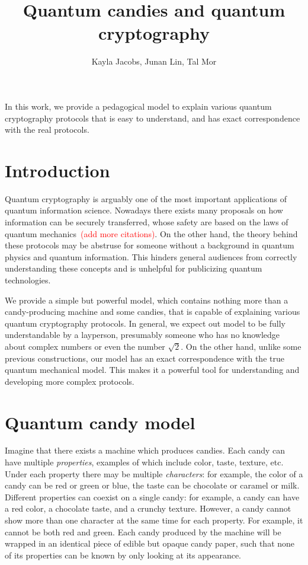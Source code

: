 \documentclass{article}
\def \todo #1{\textcolor{red}{#1}}
\begin{document}
\title{Quantum candies and quantum cryptography}
\author{Kayla Jacobs, Junan Lin, Tal Mor}
\date{}

\maketitle


In this work, we provide a pedagogical model to explain various quantum cryptography protocols that is easy to understand, and has exact correspondence with the real protocols.




\section{Introduction}
Quantum cryptography is arguably one of the most important applications of quantum information science.
Nowadays there exists many proposals on how information can be securely transferred, whose safety are based on the laws of quantum mechanics~\cite{bennett1984quantum}\todo{(add more citations)}.
On the other hand, the theory behind these protocols may be abstruse for someone without a background in quantum physics and quantum information.
This hinders general audiences from correctly understanding these concepts and is unhelpful for publicizing quantum technologies.

We provide a simple but powerful model, which contains nothing more than a candy-producing machine and some candies, that is capable of explaining various quantum cryptography protocols.
In general, we expect out model to be fully understandable by a layperson, presumably someone who has no knowledge about complex numbers or even the number $\sqrt{2}$.
On the other hand, unlike some previous constructions, our model has an exact correspondence with the true quantum mechanical model.
This makes it a powerful tool for understanding and developing more complex protocols.

\section{Quantum candy model}
Imagine that there exists a machine which produces candies.
Each candy can have multiple \textit{properties}, examples of which include color, taste, texture, etc.
Under each property there may be multiple \textit{characters}: for example, the color of a candy can be red or green or blue, the taste can be chocolate or caramel or milk.
Different properties can coexist on a single candy: for example, a candy can have a red color, a chocolate taste, and a crunchy texture.
However, a candy cannot show more than one character at the same time for each property.
For example, it cannot be both red and green.
Each candy produced by the machine will be wrapped in an identical piece of edible but opaque candy paper, such that none of its properties can be known by only looking at its appearance.
\end{document}
